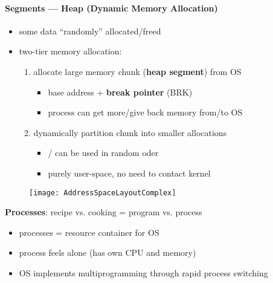 \paragraph{Segments --- Heap (Dynamic Memory Allocation)}
\begin{itemize}
	\item some data "`randomly"' allocated/freed
	\item two-tier memory allocation:
	\begin{enumerate}
		\item allocate large memory chunk (\textbf{heap segment}) from OS
		\begin{itemize}
			\item base address + \textbf{break pointer} (BRK)
			\item process can get more/give back memory from/to OS
		\end{itemize}
		\item dynamically partition chunk into smaller allocations
		\begin{itemize}
			\item {}/ can be used in random oder
			\item purely user-space, no need to contact kernel
		\end{itemize}
	\end{enumerate}
\end{itemize}

\begin{figure}[h]\centering\label{AddressSpaceLayoutComplex}\texttt{[image: AddressSpaceLayoutComplex]}\end{figure}

\begin{summary}
	\textbf{Processes}: recipe vs. cooking = program vs. process
	\begin{itemize}
		\item processes = resource container for OS
		\item process feels alone (has own CPU and memory) 
		\item OS implements multiprogramming through rapid process switching
	\end{itemize}
\end{summary}